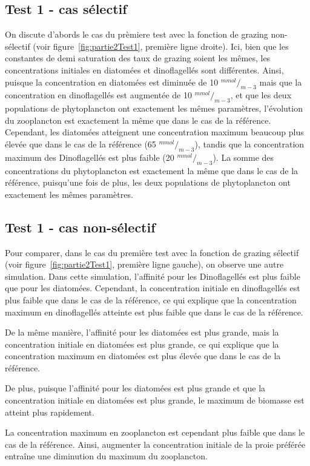 \subsection{Test 1 - cas sélectif}
\par{
On discute d'abords le cas du prèmiere test avec la fonction de grazing non-sélectif (voir
figure~\ref{fig:partie2Test1}, première ligne droite). Ici, bien que les constantes de demi saturation des
taux de grazing soient
les mêmes, les concentrations initiales en diatomées et dinoflagellés sont différentes. Ainsi, puisque
la concentration en diatomées est diminuée de 10 ${^{mmol}}/_{m-3}$ mais que la concentration en
dinoflagellés est augmentée
de 10 ${^{mmol}}/_{m-3}$, et que les deux populations de phytoplancton ont exactement les mêmes paramètres,
l'évolution du zooplancton est exactement la même que dans le cas de la référence. Cependant, les diatomées
atteignent une concentration maximum beaucoup plus élevée que dans le cas de la référence
(65 ${^{mmol}}/_{m-3}$), tandis que la concentration maximum des Dinoflagellés est plus faible
(20 ${^{mmol}}/_{m-3}$). La somme des concentrations du phytoplancton est exactement la même que dans
le cas de la référence, puisqu'une fois de plus, les deux populations de phytoplancton ont exactement
les mêmes paramètres.
}
\subsection{Test 1 - cas non-sélectif}
\par{
Pour comparer, dans le cas du première test avec la fonction de grazing sélectif (voir
figure~\ref{fig:partie2Test1}, première ligne gauche), on observe une autre simulation.
Dans cette simulation, l'affinité pour les Dinoflagellés est plus faible que pour les diatomées.
Cependant, la concentration initiale en dinoflagellés est plus faible que dans le cas de la référence,
ce qui explique que la concentration maximum en dinoflagellés atteinte est plus faible que dans le cas
de la référence.
}
\par{
De la même manière, l'affinité pour les diatomées est plus grande, mais la concentration initiale en
diatomées est plus grande, ce qui explique que la concentration maximum en diatomées est plus élevée
que dans le cas de la référence.
}
\par{
De plus, puisque l'affinité pour les diatomées est plus grande et que la concentration initiale en
diatomées est plus grande, le maximum de biomasse est atteint plus rapidement. 
}
\par{
La concentration maximum en zooplancton est cependant plus faible que dans le cas de la référence.
Ainsi, augmenter la concentration initiale de la proie préférée entraîne une diminution du maximum
du zooplancton. 
}

